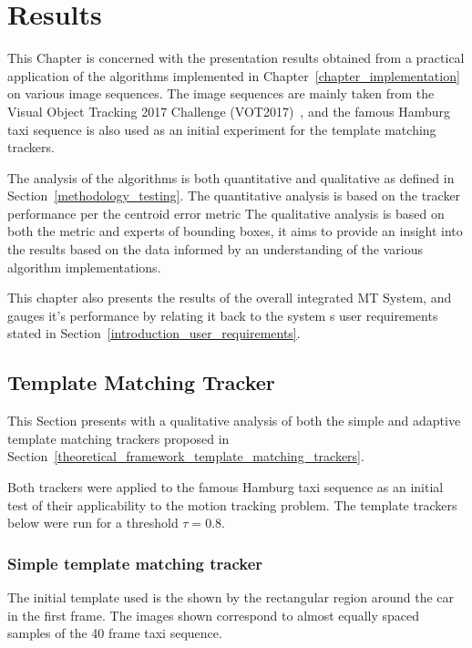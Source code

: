 \chapter{Results}\label{chapter_results}

This Chapter is concerned with the presentation results obtained from a practical
application of the algorithms implemented in
Chapter~\ref{chapter_implementation} on various image sequences. 
The image sequences are mainly taken from the Visual Object Tracking 2017
Challenge (VOT2017)~\cite{VOT2017}, and the famous Hamburg taxi sequence is also used as an
initial experiment for the template matching trackers.

The analysis of the algorithms is both quantitative and qualitative as defined
in Section~\ref{methodology_testing}. The
quantitative analysis is based on the tracker performance per the centroid error metric
The qualitative analysis is based on both the metric and experts of bounding
boxes, it aims to provide an insight into the results based on the data informed by
an understanding of the various algorithm implementations. 

This chapter also presents the results of the overall integrated MT System, and
gauges it's performance by relating it back to the system
s user requirements stated in Section~\ref{introduction_user_requirements}.


\section{Template Matching Tracker}
This Section presents with a qualitative analysis of both the simple and
adaptive template matching trackers proposed in
Section~\ref{theoretical_framework_template_matching_trackers}. 

Both trackers were applied to the famous Hamburg taxi sequence \cite{} as an initial
test of their applicability to the motion tracking problem.
The template trackers below were run for a threshold $\tau=0.8$.

\subsection{Simple template matching tracker}\label{results_simple_template_matching}
The initial template used is the shown by the rectangular region around the car
in the first frame. The images shown correspond to almost equally spaced
samples of the 40 frame taxi sequence.


